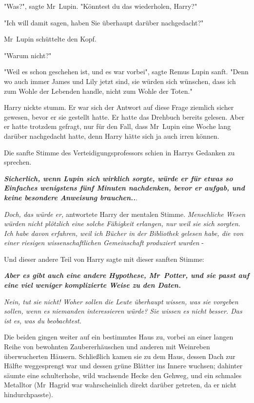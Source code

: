 {"Was?", sagte Mr~Lupin. "Könntest du das wiederholen, Harry?"

"Ich will damit sagen, haben Sie überhaupt darüber nachgedacht?"

Mr~Lupin schüttelte den Kopf.

"Warum nicht?"

"Weil es schon geschehen ist, und es war vorbei", sagte Remus Lupin sanft. "Denn wo auch immer James und Lily jetzt sind, sie würden sich wünschen, dass ich zum Wohle der Lebenden handle, nicht zum Wohle der Toten."

Harry nickte stumm. Er war sich der Antwort auf diese Frage ziemlich sicher gewesen, bevor er sie gestellt hatte. Er hatte das Drehbuch bereits gelesen. Aber er hatte trotzdem gefragt, nur für den Fall, dass Mr~Lupin eine Woche lang darüber nachgedacht hatte, denn Harry hätte sich ja auch irren können.

Die sanfte Stimme des Verteidigungsprofessors schien in Harrys Gedanken zu sprechen.

\textbf{\emph{Sicherlich, wenn Lupin sich wirklich sorgte, würde er für etwas so Einfaches wenigstens fünf Minuten nachdenken, bevor er aufgab, und keine besondere Anweisung brauchen..}}.

\emph{Doch, das würde er,} antwortete Harry der mentalen Stimme. \emph{Menschliche Wesen würden nicht plötzlich eine solche Fähigkeit erlangen, nur weil sie sich sorgten. Ich habe davon erfahren, weil ich Bücher in der Bibliothek gelesen habe, die von einer riesigen wissenschaftlichen Gemeinschaft produziert wurden} -

Und dieser andere Teil von Harry sagte mit dieser sanften Stimme:

\textbf{\emph{Aber es gibt auch eine andere Hypothese, Mr~Potter, und sie passt auf eine viel weniger komplizierte Weise zu den Daten.}}

\emph{Nein, tut sie nicht! Woher sollen die Leute überhaupt wissen, was sie vorgeben sollen, wenn es niemanden interessieren würde? Sie wissen es nicht besser. Das ist es, was du beobachtest.}

Die beiden gingen weiter auf ein bestimmtes Haus zu, vorbei an einer langen Reihe von bewohnten Zaubererhäuschen und anderen mit Weinreben überwucherten Häusern. Schließlich kamen sie zu dem Haus, dessen Dach zur Hälfte weggesprengt war und dessen grüne Blätter ins Innere wuchsen; dahinter säumte eine schulterhohe, wild wachsende Hecke den Gehweg, und ein schmales Metalltor (Mr~Hagrid war wahrscheinlich direkt darüber getreten, da er nicht hindurchpasste).

}
